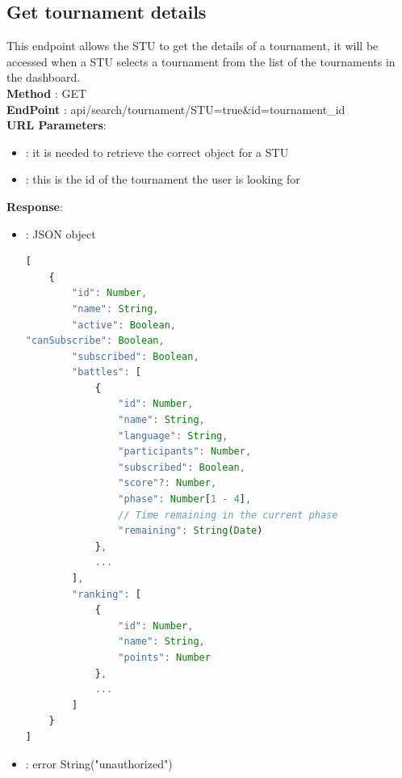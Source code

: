 \subsection*{Get tournament details}
This endpoint allows the STU to get the details of a tournament, it will be accessed when a STU selects a tournament from the list of the tournaments in the dashboard.\\
\textbf{Method} : GET \\
\textbf{EndPoint} : api/search/tournament/STU=true\&id=tournament\_id\\
\textbf{URL Parameters}:
        \begin{itemize}
            \item {} : it is needed to retrieve the correct object for a STU
            \item {} : this is the id of the tournament the user is looking for
        \end{itemize}
\textbf{Response}:
        \begin{itemize}
            \item {} : JSON object
            \begin{lstlisting}[language=JavaScript, label={lst:jscode}, basicstyle=\ttfamily]
[
    {
        "id": Number,
        "name": String,
        "active": Boolean,
"canSubscribe": Boolean,
        "subscribed": Boolean,
        "battles": [
            {
                "id": Number,
                "name": String,
                "language": String,
                "participants": Number,
                "subscribed": Boolean,
                "score"?: Number,
                "phase": Number[1 - 4],
                // Time remaining in the current phase
                "remaining": String(Date)
            },
            ...
        ],
        "ranking": [
            {
                "id": Number,
                "name": String,
                "points": Number
            },
            ...
        ]
    }
]
            \end{lstlisting}
            \item {} : error String("unauthorized")
        \end{itemize}

